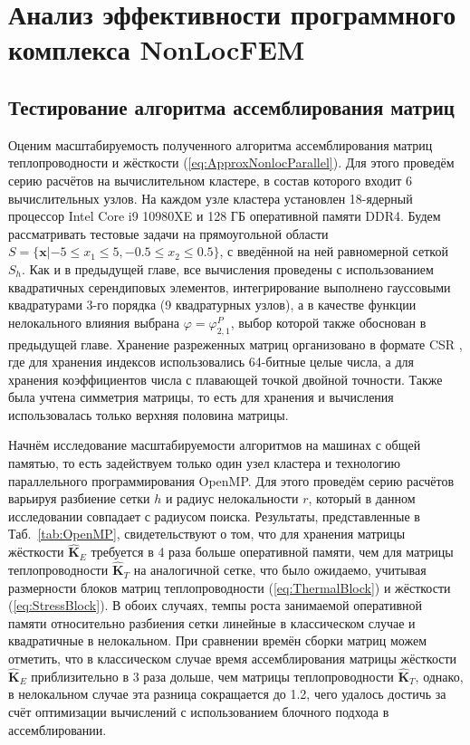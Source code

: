 \chapter{Анализ эффективности программного комплекса NonLocFEM}\label{ch:NonLocFEMAnalysis} 

\section{Тестирование алгоритма ассемблирования матриц}\label{sec:NumericalMethods/AssemblyTest}

Оценим масштабируемость полученного алгоритма ассемблирования матриц теплопроводности и жёсткости (\ref{eq:ApproxNonlocParallel}). Для этого проведём серию расчётов на вычислительном кластере, в состав которого входит 6 вычислительных узлов. На каждом узле кластера установлен 18-ядерный процессор Intel Core i9 10980XE и 128 ГБ оперативной памяти DDR4. Будем рассматривать тестовые задачи на прямоугольной области $S = \{ \boldsymbol{x} | -5 \leqslant x_1 \leqslant 5, -0.5 \leqslant x_2 \leqslant 0.5 \}$, с введённой на ней равномерной сеткой $S_h$. Как и в предыдущей главе, все вычисления проведены с использованием квадратичных серендиповых элементов, интегрирование выполнено гауссовыми квадратурами 3-го порядка (9 квадратурных узлов), а в качестве функции нелокального влияния выбрана $\varphi = \varphi_{2,1}^P$, выбор которой также обоснован в предыдущей главе. Хранение разреженных матриц организовано в формате CSR \cite{Pisanetzkiy}, где для хранения индексов использовались 64-битные целые числа, а для хранения коэффициентов числа с плавающей точкой двойной точности. Также была учтена симметрия матрицы, то есть для хранения и вычисления использовалась только верхняя половина \mbox{матрицы.}

Начнём исследование масштабируемости алгоритмов на машинах с общей памятью, то есть задействуем только один узел кластера и технологию параллельного программирования OpenMP. Для этого проведём серию расчётов варьируя разбиение сетки $h$ и радиус нелокальности $r$, который в данном исследовании совпадает с радиусом поиска. Результаты, представленные в Таб.~\ref{tab:OpenMP}, свидетельствуют о том, что для хранения матрицы жёсткости $\widehat{\textbf{K}}_E$ требуется в 4 раза больше оперативной памяти, чем для матрицы теплопроводности $\widehat{\textbf{K}}_T$ на аналогичной сетке, что было ожидаемо, учитывая размерности блоков матриц теплопроводности (\ref{eq:ThermalBlock}) и жёсткости (\ref{eq:StressBlock}). В обоих случаях, темпы роста занимаемой оперативной памяти относительно разбиения сетки линейные в классическом случае и квадратичные в нелокальном. При сравнении времён сборки матриц можем отметить, что в классическом случае время ассемблирования матрицы жёсткости $\widehat{\textbf{K}}_E$ приблизительно в 3 раза дольше, чем матрицы теплопроводности $\widehat{\textbf{K}}_T$, однако, в нелокальном случае эта разница сокращается до 1.2, чего удалось достичь за счёт оптимизации вычислений с использованием блочного подхода в ассемблировании.


